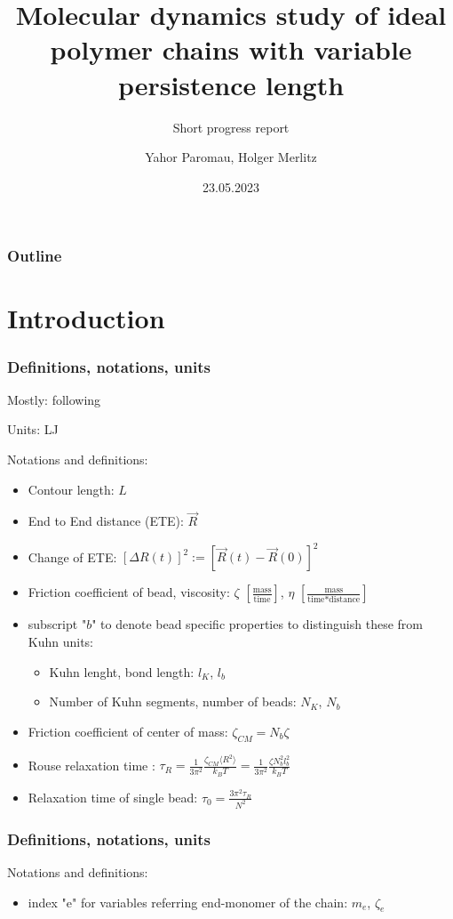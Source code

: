 \documentclass[handout]{beamer}
\title{Molecular dynamics study of ideal polymer chains with variable persistence length}
\subtitle{Short progress report}
\author{Yahor Paromau, Holger Merlitz}
\institute{ITP@IPF}
\date{23.05.2023}
\newcommand{\mean}[1]{\langle #1 \rangle}
\begin{document}
\begin{frame}
    \titlepage
\end{frame}


\begin{frame}
    \frametitle{Outline}
    \tableofcontents
\end{frame}

\section{Introduction}

\begin{frame}
    \frametitle{Definitions, notations, units}
    Mostly: following \cite{svaneborg_2020}

    Units: LJ

    Notations and definitions:

    \begin{itemize}
        \item Contour length: $L$
        \item End to End distance (ETE): $\vec{R}$
        \item Change of ETE: $[\Delta R(t)]^2 := [\vec{R}(t)-\vec{R}(0)]^2$
        \item Friction coefficient of bead, viscosity: $\zeta$ $[\frac{\textrm{mass}}{\textrm{time}}]$, $\eta$ $[\frac{\textrm{mass}}{\textrm{time} * \textrm{distance}}]$
        \item subscript "$b$" to denote bead speciﬁc properties to distinguish these from Kuhn units:
            \begin{itemize}
                \item Kuhn lenght, bond length: $l_K$, $l_b$
                \item Number of Kuhn segments, number of beads: $N_K$, $N_b$
            \end{itemize}
        \item Friction coefficient of center of mass: $\zeta_{CM}=N_b \zeta$ 
        \item Rouse relaxation time \cite{svaneborg_2020}: $\tau_R = \frac{1}{3 \pi^2} \frac{\zeta_{CM} \mean{R^2}}{k_B T} = \frac{1}{3 \pi^2} \frac{\zeta N_b^2 l_b^2}{k_B T}$
        \item Relaxation time of single bead: $\tau_0 = \frac{3\pi^2 \tau_R}{N^2}$ 
    \end{itemize}

\end{frame}

\begin{frame}
    \frametitle{Definitions, notations, units}

    Notations and definitions:

    \begin{itemize}
        \item index "e" for variables referring end-monomer of the chain: $m_e$, $\zeta_e$ 
    \end{itemize}

\end{frame}
    
\end{document}
